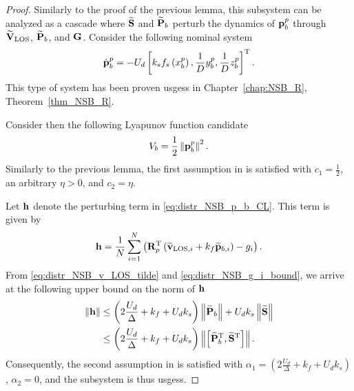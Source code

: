 \begin{proof}
    Similarly to the proof of the previous lemma, this subsystem can be analyzed as a cascade where ${\widetilde{\mathbf{S}}}$ and ${\widetilde{\mathbf{P}}}_{b}$ perturb the dynamics of $\mathbf{p}_b^p$ through $\widetilde{\mathbf{V}}_{\rm LOS}$, ${\widetilde{\mathbf{P}}}_{b}$, and $\mathbf{G}$.
    Consider the following nominal system
    \begin{equation}
        \dot{\mathbf{p}}_b^p = - U_d \left[k_s f_s\left(x_b^p\right), \frac{1}{D} y_b^p, \frac{1}{D} z_b^p\right]^{\mathrm{T}}.
        \label{eq:distr_NSB_p_b_nominal}
    \end{equation}
    This type of system has been proven \glspl{usges} in Chapter~\ref{chap:NSB_R}, Theorem~\ref{thm_NSB_R}.

    Consider then the following Lyapunov function candidate
    \begin{equation}
        V_b = \frac{1}{2} \left\|\mathbf{p}_b^p\right\|^2.
    \end{equation}
    Similarly to the previous lemma, the first assumption in \cite[Proposition 9]{pettersen_lyapunov_2017} is satisfied with $c_1 = \frac{1}{2}$, an arbitrary $\eta > 0$, and $c_2 = \eta$.
    
    Let $\mathbf{h}$ denote the perturbing term in \eqref{eq:distr_NSB_p_b_CL}. This term is given by
    \begin{equation}
        \mathbf{h} = \frac{1}{N} \sum_{i=1}^N \left(\mathbf{R}_p^{\mathrm{T}} \left(\widetilde{\mathbf{v}}_{{\rm LOS}, i} + k_f \widetilde{\mathbf{p}}_{b, i}\right) - g_i \right).
    \end{equation}
    From \eqref{eq:distr_NSB_v_LOS_tilde} and \eqref{eq:distr_NSB_g_i_bound}, we arrive at the following upper bound on the norm of $\mathbf{h}$
    \begin{align}
        \left\|\mathbf{h}\right\| &\leq \left(2\frac{U_d}{\Delta} + k_f + U_d k_s\right) \left\|\widetilde{\mathbf{P}}_b\right\| + U_d k_s \left\|\widetilde{\mathbf{S}}\right\| \nonumber \\
        &\leq \left(2\frac{U_d}{\Delta} + k_f + U_d k_s\right) \left\|\left[\widetilde{\mathbf{P}}_b^{\mathrm{T}}, \widetilde{\mathbf{S}}^{\mathrm{T}}\right]\right\|.
    \end{align}
    Consequently, the second assumption in \cite[Proposition 9]{pettersen_lyapunov_2017} is satisfied with $\alpha_1 = \left(2\frac{U_d}{\Delta} + k_f + U_d k_s\right)$, $\alpha_2 = 0$, and the subsystem is thus \glspl{usges}.
\end{proof}

